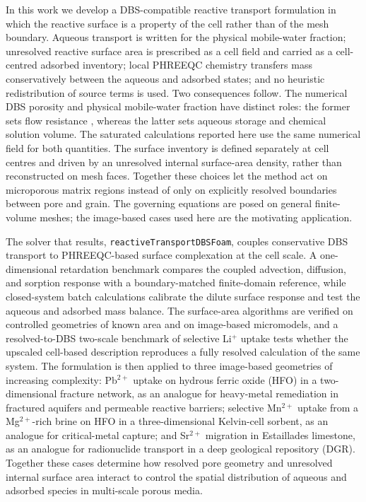 In this work we develop a DBS-compatible reactive transport formulation in
which the reactive surface is a property of the cell rather than of the mesh
boundary. Aqueous transport is written for the physical mobile-water fraction;
unresolved reactive surface area is prescribed as a cell field and carried as a
cell-centred adsorbed inventory; local PHREEQC chemistry transfers mass
conservatively between the aqueous and adsorbed states; and no heuristic
redistribution of source terms is used. Two consequences follow. The numerical
DBS porosity and physical mobile-water fraction have distinct roles: the former
sets flow resistance \citep{soulaine2016micro}, whereas the latter sets aqueous
storage and chemical solution volume. The saturated calculations reported here
use the same numerical field for both quantities. The surface inventory is
defined separately at cell centres and driven by an unresolved internal
surface-area density, rather than reconstructed on mesh
faces. Together these choices let the method act on microporous matrix regions
instead of only on explicitly resolved boundaries between pore and grain. The
governing equations are posed on general finite-volume meshes; the image-based
cases used here are the motivating application.

The solver that results, \texttt{reactiveTransportDBSFoam}, couples
conservative DBS transport to PHREEQC-based surface complexation at the cell
scale. A one-dimensional retardation benchmark compares the coupled advection,
diffusion, and sorption response with a boundary-matched finite-domain
reference, while closed-system batch calculations calibrate the dilute surface
response and test the aqueous and adsorbed mass balance.
The surface-area algorithms are verified on controlled geometries of known area
and on image-based micromodels, and a resolved-to-DBS two-scale benchmark of
selective Li$^{+}$ uptake tests whether the upscaled cell-based description
reproduces a fully resolved calculation of the same system. The formulation is
then applied to three image-based geometries of increasing complexity:
Pb$^{2+}$ uptake on hydrous ferric oxide (HFO) in a two-dimensional fracture
network, as an analogue for heavy-metal remediation in fractured aquifers and
permeable reactive barriers; selective Mn$^{2+}$ uptake from a Mg$^{2+}$-rich
brine on HFO in a three-dimensional Kelvin-cell sorbent, as an analogue for
critical-metal capture; and Sr$^{2+}$ migration in Estaillades limestone, as an
analogue for radionuclide transport in a deep geological repository (DGR).
Together these cases determine how resolved pore geometry and unresolved
internal surface area interact to control the spatial distribution of aqueous
and adsorbed species in multi-scale porous media.

